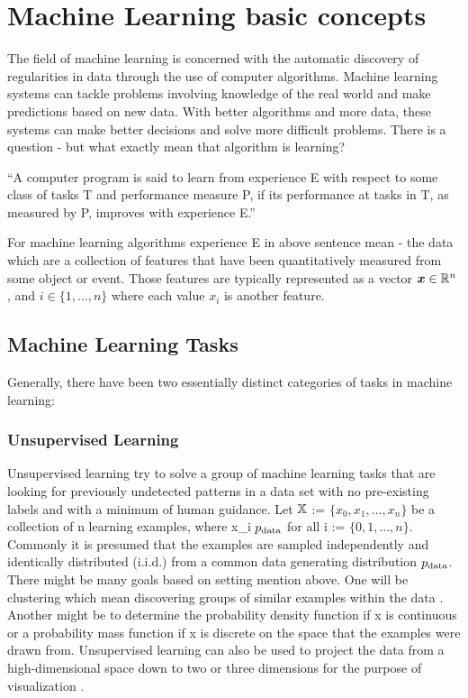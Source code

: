 \documentclass[12pt]{article}
\theoremstyle{definition}
\DeclareRobustCommand{\[}{\begin{equation}}
\DeclareRobustCommand{\]}{\end{equation}}
\begin{document}
 
\section{Machine Learning basic concepts}
The field of machine learning is concerned with the automatic discovery
of regularities in data through the use of computer algorithms. 
Machine learning systems can tackle problems involving
knowledge of the real world and make predictions based on new data. With better algorithms and more data, these systems can make better decisions and solve more difficult problems.
There is a question - but what exactly mean that algorithm is learning? 

“A computer program is said to learn from experience E
with respect to some class of tasks T and performance measure
P, if its performance at tasks in T, as measured by P, improves with experience E.” \cite{MachineLearning}

For machine learning algorithms experience E in above sentence mean - the data which are a collection of
features that have been quantitatively measured from some object or event. Those features are typically represented as a
vector ${\bm{x}} \in {\mathbb{R}}^{n}$, and $i \in {\{1, \dots, n\}}$ where each value $x_i$ is another feature.

    \subsection{Machine Learning Tasks}
    Generally, there have been two essentially distinct categories of tasks in machine
    learning:
        
        \subsubsection{Unsupervised Learning}
        Unsupervised learning try to solve a group of machine learning tasks that are looking for previously undetected patterns in a data set with no pre-existing labels and with a minimum of human guidance. Let $\displaystyle {\mathbb{X}}$ := $\displaystyle \{x_0, x_1, \dots, x_n \}$ be a collection of n learning examples, where x_i \in\; $\displaystyle p_{\rm{data}}$ for all i \in [n] := \;$\displaystyle \{0, 1, \dots, n \}$. Commonly it is presumed that the examples are sampled independently and identically distributed (i.i.d.) from a common data generating distribution $\displaystyle p_{\rm{data}}$. There might be many goals based on setting mention above. One will be clustering which mean discovering groups of similar examples within the data \cite{clustering}. Another might be to determine the probability density function if x is continuous \cite{density_estimation} or a probability mass function if x is
        discrete \cite{mass_probability_estimation} on the space that the examples were drawn from. Unsupervised learning can also be used to project the data from a high-dimensional
        space down to two or three dimensions for the purpose of visualization \cite{t-sne} \cite{pca}. \cite{ProbabilisticApproach}
        
\end{document}
